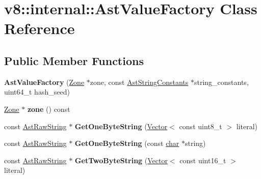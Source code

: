 \hypertarget{classv8_1_1internal_1_1AstValueFactory}{}\section{v8\+:\+:internal\+:\+:Ast\+Value\+Factory Class Reference}
\label{classv8_1_1internal_1_1AstValueFactory}
\subsection*{Public Member Functions}
\begin{DoxyCompactItemize}
\item 
\mbox{\label{classv8_1_1internal_1_1AstValueFactory_addb1e38c90d9ddef16efd72c55a2c72d}} 
{\bfseries Ast\+Value\+Factory} (\mbox{\hyperlink{classv8_1_1internal_1_1Zone}{Zone}} $\ast$zone, const \mbox{\hyperlink{classv8_1_1internal_1_1AstStringConstants}{Ast\+String\+Constants}} $\ast$string\+\_\+constants, uint64\+\_\+t hash\+\_\+seed)
\item 
\mbox{\label{classv8_1_1internal_1_1AstValueFactory_a0ff6224021be46edc4ec35565f49b680}} 
\mbox{\hyperlink{classv8_1_1internal_1_1Zone}{Zone}} $\ast$ {\bfseries zone} () const
\item 
\mbox{\label{classv8_1_1internal_1_1AstValueFactory_a2474bab6fd2ffbb9b02058a058a146e6}} 
const \mbox{\hyperlink{classv8_1_1internal_1_1AstRawString}{Ast\+Raw\+String}} $\ast$ {\bfseries Get\+One\+Byte\+String} (\mbox{\hyperlink{classv8_1_1internal_1_1Vector}{Vector}}$<$ const uint8\+\_\+t $>$ literal)
\item 
\mbox{\label{classv8_1_1internal_1_1AstValueFactory_a4de86ce5c6002dec8cd8e441a36871ac}} 
const \mbox{\hyperlink{classv8_1_1internal_1_1AstRawString}{Ast\+Raw\+String}} $\ast$ {\bfseries Get\+One\+Byte\+String} (const \mbox{\hyperlink{classchar}{char}} $\ast$string)
\item 
\mbox{\label{classv8_1_1internal_1_1AstValueFactory_ac6cec94eb0417d5570d238e1f5a74504}} 
const \mbox{\hyperlink{classv8_1_1internal_1_1AstRawString}{Ast\+Raw\+String}} $\ast$ {\bfseries Get\+Two\+Byte\+String} (\mbox{\hyperlink{classv8_1_1internal_1_1Vector}{Vector}}$<$ const uint16\+\_\+t $>$ literal)

\end{DoxyCompactItemize}
